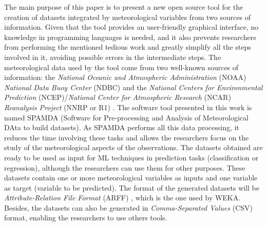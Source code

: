 \documentclass[energies,article,submit,moreauthors,pdftex]{Definitions/mdpi}
\begin{document}
		The main purpose of this paper is to present a new open source tool for the creation of datasets integrated by meteorological variables from two sources of information. Given that the tool provides an user-friendly graphical interface, no knowledge in programming languages is needed, and it also prevents researchers from performing the mentioned tedious work and greatly simplify all the steps involved in it, avoiding possible errors in the intermediate steps. The meteorological data used by the tool come from two well-known sources of information: the \textit{National Oceanic and Atmospheric Administration} (NOAA) \textit{National Data Buoy Center} (NDBC) \cite{NOAA} and the \textit{National Centers for Environmental Prediction} (NCEP)/\textit{National Center for Atmospheric Research} (NCAR) \textit{Reanalysis Project} (NNRP or R1) \cite{Kalnay1996, Kistler2001}. The software tool presented in this work is named SPAMDA (Software for Pre-processing and Analysis of Meteorological DAta to build datasets). As SPAMDA performs all this data processing, it reduces the time involving these tasks and allows the researchers focus on the study of the meteorological aspects of the observations. The datasets obtained are ready to be used as input for ML techniques in prediction tasks (classification or regression), although the researchers can use them for other purposes. These datasets contain one or more meteorological variables as inputs and one variable as target (variable to be predicted). The format of the generated datasets will be \textit{Attribute-Relation File Format} (ARFF) \cite{WEKA_ARFF}, which is the one used by WEKA. Besides, the datasets can also be generated in \textit{Comma-Separated Values} (CSV) format, enabling the researchers to use others tools.
\end{document}
